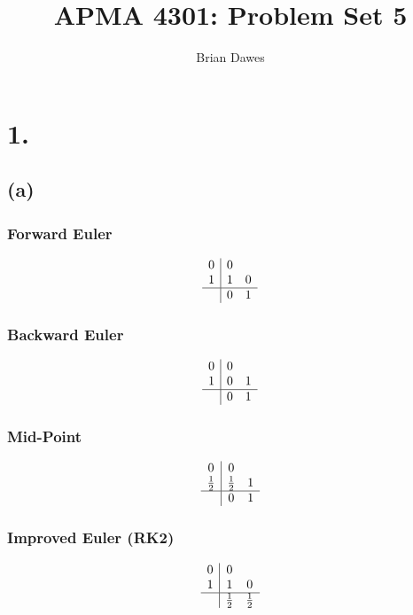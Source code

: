 \documentclass{article}
\begin{document}
\title{APMA 4301: Problem Set 5}
\author{Brian Dawes}
\maketitle

\section*{1.}
\subsection*{(a)}
\renewcommand{\arraystretch}{1.2}
\subsubsection*{Forward Euler}
\begin{equation}
\begin{array}{c|cc}
0 & 0 \\
1 & 1 & 0 \\
\hline
 & 0 & 1
\end{array}
\end{equation}

\subsubsection*{Backward Euler}
\begin{equation}
\begin{array}{c|cc}
0 & 0 \\
1 & 0 & 1 \\
\hline
& 0 & 1
\end{array}
\end{equation}

\subsubsection*{Mid-Point}
\begin{equation}
\begin{array}{c|cc}
0 & 0 \\
\frac{1}{2} & \frac{1}{2} & 1 \\
\hline
& 0 & 1
\end{array}
\end{equation}


\subsubsection*{Improved Euler (RK2)}
\begin{equation}
\begin{array}{c|cc}
0 & 0 \\
1 & 1 & 0 \\
\hline
& \frac{1}{2} & \frac{1}{2}
\end{array}
\end{equation}
\end{document}
